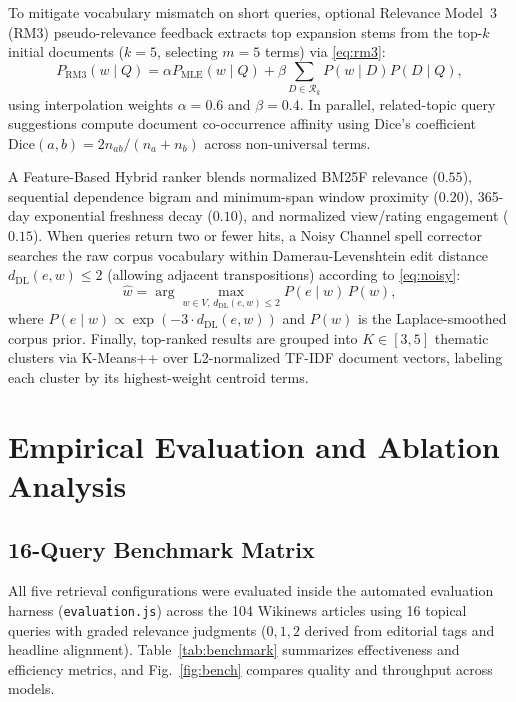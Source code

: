 To mitigate vocabulary mismatch on short queries, optional Relevance Model~3 (RM3) pseudo-relevance feedback \cite{b4} extracts top expansion stems from the top-$k$ initial documents ($k=5$, selecting $m=5$ terms) via \eqref{eq:rm3}:
\begin{equation}
P_{\text{RM3}}(w \mid Q) = \alpha P_{\text{MLE}}(w \mid Q) + \beta \sum_{D \in \mathcal{R}_k} P(w \mid D) P(D \mid Q),
\label{eq:rm3}
\end{equation}
using interpolation weights $\alpha = 0.6$ and $\beta = 0.4$. In parallel, related-topic query suggestions compute document co-occurrence affinity using Dice's coefficient $\text{Dice}(a, b) = 2 n_{ab} / (n_a + n_b)$ across non-universal terms.

A Feature-Based Hybrid ranker blends normalized BM25F relevance ($0.55$), sequential dependence bigram and minimum-span window proximity ($0.20$), 365-day exponential freshness decay ($0.10$), and normalized view/rating engagement ($0.15$). When queries return two or fewer hits, a Noisy Channel spell corrector \cite{b6} searches the raw corpus vocabulary within Damerau-Levenshtein edit distance $d_{\text{DL}}(e, w) \le 2$ (allowing adjacent transpositions) according to \eqref{eq:noisy}:
\begin{equation}
\hat{w} = \arg\max_{w \in V,\, d_{\text{DL}}(e, w) \le 2} P(e \mid w)\, P(w),
\label{eq:noisy}
\end{equation}
where $P(e \mid w) \propto \exp(-3 \cdot d_{\text{DL}}(e,w))$ and $P(w)$ is the Laplace-smoothed corpus prior. Finally, top-ranked results are grouped into $K \in [3, 5]$ thematic clusters via K-Means++ over L2-normalized TF-IDF document vectors, labeling each cluster by its highest-weight centroid terms.

\section{Empirical Evaluation and Ablation Analysis}

\subsection{16-Query Benchmark Matrix}
All five retrieval configurations were evaluated inside the automated evaluation harness (\texttt{evaluation.js}) across the 104 Wikinews articles using 16 topical queries with graded relevance judgments ($0, 1, 2$ derived from editorial tags and headline alignment). Table~\ref{tab:benchmark} summarizes effectiveness and efficiency metrics, and Fig.~\ref{fig:bench} compares quality and throughput across models.

